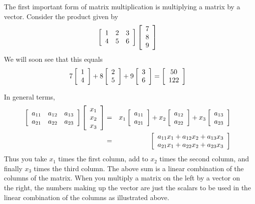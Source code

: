 The first important form of matrix multiplication is multiplying a matrix by a vector. 
Consider the product given by
\begin{equation*}
\left[
\begin{array}{rrr}
1 & 2 & 3 \\
4 & 5 & 6
\end{array}
\right] \left[
\begin{array}{r}
7 \\
8 \\
9
\end{array}
\right]
\end{equation*}
We will soon see that this equals
\begin{equation*}
7\left[
\begin{array}{c}
1 \\
4
\end{array}
\right] +8\left[
\begin{array}{c}
2 \\
5
\end{array}
\right] +9\left[
\begin{array}{c}
3 \\
6
\end{array}
\right] =\left[
\begin{array}{c}
50 \\
122
\end{array}
\right]
\end{equation*}

In general terms,
\begin{eqnarray*}
\left[
\begin{array}{ccc}
a_{11} & a_{12} & a_{13} \\
a_{21} & a_{22} & a_{23}
\end{array}
\right] \left[
\begin{array}{c}
x_{1} \\
x_{2} \\
x_{3}
\end{array}
\right] &=&\allowbreak x_{1}\left[
\begin{array}{c}
a_{11} \\
a_{21}
\end{array}
\right] +x_{2}\left[
\begin{array}{c}
a_{12} \\
a_{22}
\end{array}
\right] +x_{3}\left[
\begin{array}{c}
a_{13} \\
a_{23}
\end{array}
\right] \\
&=&\left[
\begin{array}{c}
a_{11}x_{1}+a_{12}x_{2}+a_{13}x_{3} \\
a_{21}x_{1}+a_{22}x_{2}+a_{23}x_{3}
\end{array}
\right] 
\end{eqnarray*}
Thus you take $x_{1}$ times the first column, add to $x_{2}$ times the
second column, and finally $x_{3}$ times the third column. The above sum is a linear combination of the columns of the matrix.
When you multiply a matrix on the left by a vector on the right,
the numbers making up the vector are just the scalars to be used in the
linear combination of the columns as illustrated above.

